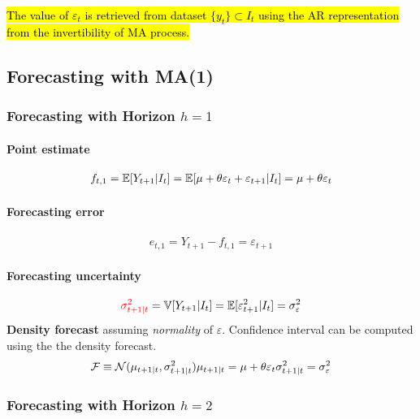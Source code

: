 \documentclass[11pt]{article}
\begin{document}
			\begin{remark}
				\hl{The value of $\varepsilon_t$ is retrieved from dataset $\{y_t\} \subset I_t$ using the AR representation from the invertibility of MA process.}
			\end{remark}
		\subsection{Forecasting with MA(1)}
			\subsubsection{Forecasting with Horizon $h=1$}
				\paragraph{Point estimate}
					\begin{gather}
						f_{t,1} = \mathbb{E}[{Y_{t+1}|I_t}]
						= \mathbb{E}[{\mu + \theta \varepsilon_{t} + \varepsilon_{t+1}|I_t}]
						= \mu + \theta \varepsilon_t
					\end{gather}
				\paragraph{Forecasting error}
					\begin{gather}
						e_{t,1} = Y_{t+1} - f_{t,1} = \varepsilon_{t+1}
					\end{gather}
				\paragraph{Forecasting uncertainty}
					\begin{gather}
						\textcolor{red}{\sigma_{t+1|t}^2} = \mathbb{V}[{Y_{t+1}|I_t}]
						= \mathbb{E}[{\varepsilon_{t+1}^2|I_t}]
						= \sigma^2_\varepsilon
					\end{gather}
				\textbf{Density forecast} assuming \emph{normality} of $\varepsilon$. Confidence interval can be computed using the the density forecast.
					\begin{gather}
						\mathcal{{F}} \equiv \mathcal{{N}}(\mu_{t+1|t}, \sigma_{t+1|t}^2)
						\mu_{t+1|t} = \mu + \theta \varepsilon_t
						\sigma_{t+1|t}^2 =  \sigma^2_\varepsilon
					\end{gather}
			\subsubsection{Forecasting with Horizon $h=2$}
\end{document}
